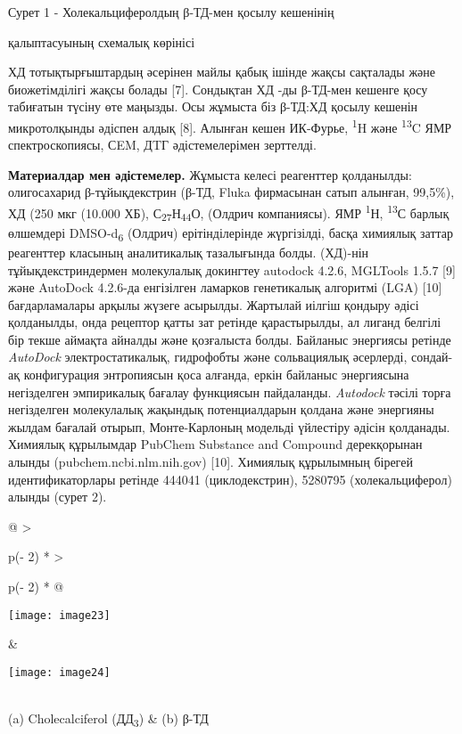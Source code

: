 Сурет 1 - Холекальциферолдың β-ТД-мен қосылу кешенінің

қалыптасуының схемалық көрінісі

ХД тотықтырғыштардың әсерінен майлы қабық ішінде жақсы сақталады және
биожетімділігі жақсы болады {[}7{]}. Сондықтан ХД -ды β-ТД-мен кешенге
қосу табиғатын түсіну өте маңызды. Осы жұмыста біз β-ТД:ХД қосылу
кешенін микротолқынды әдіспен алдық {[}8{]}. Алынған кешен ИК-Фурье,
\textsuperscript{1}H және \textsuperscript{13}C ЯМР спектроскопиясы,
СEM, ДTГ әдістемелерімен зерттелді.

{\bfseries Материалдар мен әдістемелер.} Жұмыста келесі реагенттер
қолданылды: олигосахарид β-тұйықдекстрин (β-ТД, Fluka фирмасынан сатып
алынған, 99,5\%), ХД (250 мкг (10.000 ХБ),
С\textsubscript{27}Н\textsubscript{44}О, (Олдрич компаниясы). ЯМР
\textsuperscript{1}Н, \textsuperscript{13}С барлық өлшемдері
DMSO-d\textsubscript{6} (Олдрич) ерітінділерінде жүргізілді, басқа
химиялық заттар реагенттер класының аналитикалық тазалығында болды.
(ХД)-нін тұйықдекстриндермен молекулалық докингтеу autodock 4.2.6,
MGLTools 1.5.7 {[}9{]} және AutoDock 4.2.6-да енгізілген ламарков
генетикалық алгоритмі (LGA) {[}10{]} бағдарламалары арқылы жүзеге
асырылды. Жартылай иілгіш қондыру әдісі қолданылды, онда рецептор қатты
зат ретінде қарастырылды, ал лиганд белгілі бір текше аймақта айналды
және қозғалыста болды. Байланыс энергиясы ретінде \emph{AutoDock}
электростатикалық, гидрофобты және сольвациялық әсерлерді, сондай-ақ
конфигурация энтропиясын қоса алғанда, еркін байланыс энергиясына
негізделген эмпирикалық бағалау функциясын пайдаланды. \emph{Autodock}
тәсілі торға негізделген молекулалық жақындық потенциалдарын қолдана
және энергияны жылдам бағалай отырып, Монте-Карлоның модельді үйлестіру
әдісін қолданады. Химиялық құрылымдар PubChem Substance and Compound
дерекқорынан алынды (pubchem.ncbi.nlm.nih.gov) {[}10{]}. Химиялық
құрылымның бірегей идентификаторлары ретінде 444041 (циклодекстрин),
5280795 (холекальциферол) алынды (сурет 2).

\begin{longtable}[]{@{}
  >{\raggedright\arraybackslash}p{(\columnwidth - 2\tabcolsep) * }
  >{\raggedright\arraybackslash}p{(\columnwidth - 2\tabcolsep) * }@{}}
\toprule\noalign{}
\begin{minipage}[b]{\linewidth}\raggedright
\texttt{[image: image23]}
\end{minipage} & \begin{minipage}[b]{\linewidth}\raggedright
\texttt{[image: image24]}
\end{minipage} \\
\midrule\noalign{}
\endhead
\bottomrule\noalign{}
\endlastfoot
(a) Cholecalciferol (ДД\textsubscript{3}) & (b) β-ТД \\
 \\
\end{longtable}

